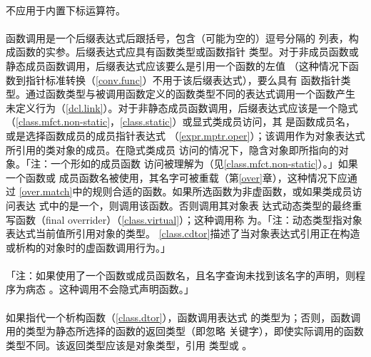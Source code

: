 \paragraph{}
不应用于内置下标运算符。


\paragraph{}
函数调用是一个后缀表达式后跟括号，包含（可能为空的）逗号分隔的
列表，构成函数的实参。后缀表达式应具有函数类型或函数指针
类型。对于非成员函数或静态成员函数调用，后缀表达式应该要么是引用一个函数的左值
（这种情况下函数到指针标准转换（\ref{conv.func}）不用于该后缀表达式），要么具有
函数指针类型。通过函数类型与被调用函数定义的函数类型不同的表达式调用一个函数产生
未定义行为（\ref{dcl.link}）。对于非静态成员函数调用，后缀表达式应该是一个隐式
（\ref{class.mfct.non-static}，\ref{class.static}）或显式类成员访问，其
是函数成员名，或是选择函数成员的成员指针表达式
（\ref{expr.mptr.oper}）；该调用作为对象表达式所引用的类对象的成员。在隐式类成员
访问的情况下，隐含对象即所指向的对象。「注：一个形如的成员函数
访问被理解为（见\ref{class.mfct.non-static}）。」如果一个函数或
成员函数名被使用，其名字可被重载（第\ref{over}章），这种情况下应通过
\ref{over.match}中的规则合适的函数。如果所选函数为非虚函数，或如果类成员访问表达
式中的是一个，则调用该函数。否则调用其对象表
达式动态类型的最终重写函数（final overrider）（\ref{class.virtual}）；这种调用称
为。「注：动态类型指对象表达式当前值所引用对象的类型。
\ref{class.cdtor}描述了当对象表达式引用正在构造或析构的对象时的虚函数调用行为。」

\paragraph{}
「注：如果使用了一个函数或成员函数名，且名字查询未找到该名字的声明，则程序为病态
。这种调用不会隐式声明函数。」

\paragraph{}
如果指代一个析构函数（\ref{class.dtor}），函数调用表达式
的类型为；否则，函数调用的类型为静态所选择的函数的返回类型（即忽略
关键字），即使实际调用的函数类型不同。该返回类型应该是对象类型，引用
类型或 。

